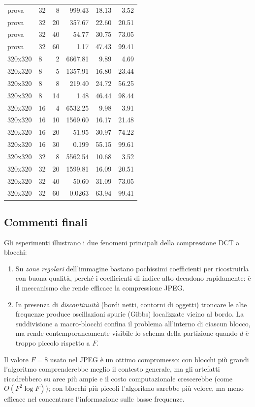 \documentclass[11pt,a4paper]{article}
\begin{document}
\begin{longtable}{llrrrr}
prova & 32 & 8 & 999.43 & 18.13 & 3.52 \\
prova & 32 & 20 & 357.67 & 22.60 & 20.51 \\
prova & 32 & 40 & 54.77 & 30.75 & 73.05 \\
prova & 32 & 60 & 1.17 & 47.43 & 99.41 \\
320x320 & 8 & 2 & 6667.81 & 9.89 & 4.69 \\
320x320 & 8 & 5 & 1357.91 & 16.80 & 23.44 \\
320x320 & 8 & 8 & 219.40 & 24.72 & 56.25 \\
320x320 & 8 & 14 & 1.48 & 46.44 & 98.44 \\
320x320 & 16 & 4 & 6532.25 & 9.98 & 3.91 \\
320x320 & 16 & 10 & 1569.60 & 16.17 & 21.48 \\
320x320 & 16 & 20 & 51.95 & 30.97 & 74.22 \\
320x320 & 16 & 30 & 0.199 & 55.15 & 99.61 \\
320x320 & 32 & 8 & 5562.54 & 10.68 & 3.52 \\
320x320 & 32 & 20 & 1599.81 & 16.09 & 20.51 \\
320x320 & 32 & 40 & 50.60 & 31.09 & 73.05 \\
320x320 & 32 & 60 & 0.0263 & 63.94 & 99.41 \\
\end{longtable}

\subsection{Commenti finali}\label{sec:commenti}

Gli esperimenti illustrano i due fenomeni principali della compressione DCT a
blocchi:
\begin{enumerate}
  \item Su \emph{zone regolari} dell'immagine bastano pochissimi coefficienti
        per ricostruirla con buona qualità, perché i coefficienti di indice
        alto decadono rapidamente: è il meccanismo che rende efficace la
        compressione JPEG.
  \item In presenza di \emph{discontinuità} (bordi netti, contorni di oggetti)
        troncare le alte frequenze produce oscillazioni spurie (Gibbs)
        localizzate vicino al bordo. La suddivisione a macro-blocchi confina il
        problema all'interno di ciascun blocco, ma rende contemporaneamente
        visibile lo schema della partizione quando $d$ è troppo piccolo rispetto
        a $F$.
\end{enumerate}
Il valore $F=8$ usato nel JPEG è un ottimo compromesso: con blocchi più grandi
l'algoritmo \guillemotleft comprenderebbe\guillemotright{} meglio il contesto
generale, ma gli artefatti ricadrebbero su aree più ampie e il costo
computazionale crescerebbe (come $O(F^2\log F)$); con blocchi più piccoli
l'algoritmo sarebbe più veloce, ma meno efficace nel concentrare
l'informazione sulle basse frequenze.
\end{document}

